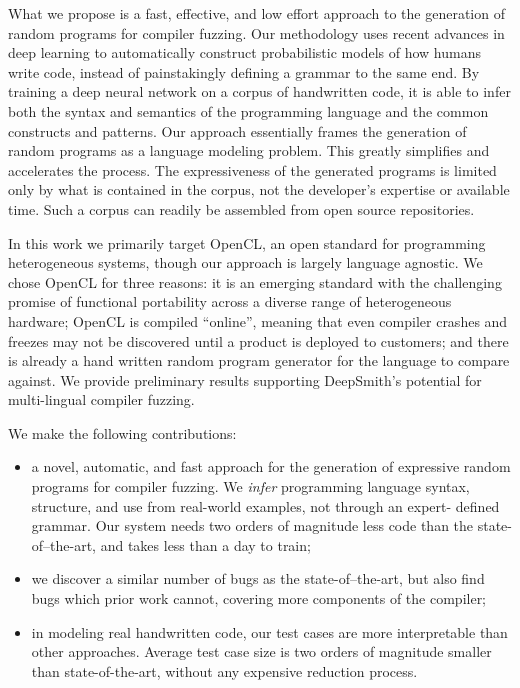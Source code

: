 What we propose is a fast, effective, and low effort approach to the generation
of random programs for compiler fuzzing. Our methodology uses recent advances in
deep learning to automatically construct probabilistic models of how humans
write code, instead of painstakingly defining a grammar to the same end. By
training a deep neural network on a corpus of handwritten code, it is able to
infer both the syntax and semantics of the programming language and the common
constructs and patterns. Our approach essentially frames the generation of
random programs as a language modeling problem. This greatly simplifies and
accelerates the process. The expressiveness of the generated programs is limited
only by what is contained in the corpus, not the developer's expertise or
available time. Such a corpus can readily be assembled from open source
repositories.

In this work we primarily target OpenCL, an open standard for programming
heterogeneous systems, though our approach is largely language agnostic. We
chose OpenCL for three reasons: it is an emerging standard with the challenging
promise of functional portability across a diverse range of heterogeneous
hardware; OpenCL is compiled ``online'', meaning that even compiler crashes and
freezes may not be discovered until a product is deployed to customers; and
there is already a hand written random program generator for the language to
compare against. We provide preliminary results supporting DeepSmith's potential
for multi-lingual compiler fuzzing.

We make the following contributions:
%
\begin{itemize}
  \item a novel, automatic, and fast approach for the generation of expressive
  random programs for compiler fuzzing. We \emph{infer} programming language
  syntax, structure, and use from real-world examples, not through an expert-
  defined grammar. Our system needs two orders of magnitude less code than the
  state-of–the-art, and takes less than a day to train;

  \item we discover a similar number of bugs as the state-of–the-art, but also
  find bugs which prior work cannot, covering more components of the compiler;

  \item in modeling real handwritten code, our test cases are more
  interpretable than other approaches. Average test case size is two orders of
  magnitude smaller than state-of-the-art, without any expensive reduction
  process.
\end{itemize}
